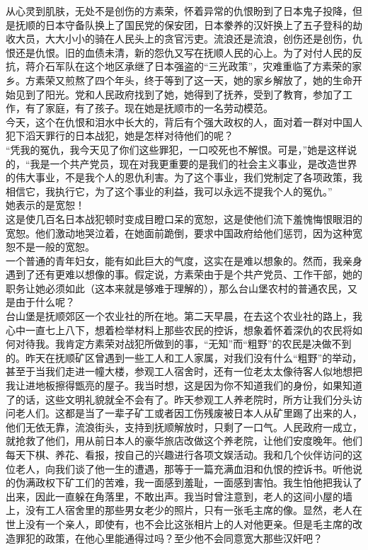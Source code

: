 从心灵到肌肤，无处不是创伤的方素荣，怀着异常的仇恨盼到了日本鬼子投降，但是抚顺的日本守备队换上了国民党的保安团，日本豢养的汉奸换上了五子登科的劫收大员，大大小小的骑在人民头上的贪官污吏。流浪还是流浪，创伤还是创伤，仇恨还是仇恨。旧的血债未清，新的怨仇又写在抚顺人民的心上。为了对付人民的反抗，蒋介石军队在这个地区承继了日本强盗的“三光政策”，灾难重临了方素荣的家乡。方素荣又煎熬了四个年头，终于等到了这一天，她的家乡解放了，她的生命开始见到了阳光。党和人民政府找到了她，她得到了抚养，受到了教育，参加了工作，有了家庭，有了孩子。现在她是抚顺市的一名劳动模范。\\

今天，这个在仇恨和泪水中长大的，背后有个强大政权的人，面对着一群对中国人犯下滔天罪行的日本战犯，她是怎样对待他们的呢？\\

“凭我的冤仇，我今天见了你们这些罪犯，一口咬死也不解恨。可是，”她是这样说的，“我是一个共产党员，现在对我更重要的是我们的社会主义事业，是改造世界的伟大事业，不是我个人的恩仇利害。为了这个事业，我们党制定了各项政策，我相信它，我执行它，为了这个事业的利益，我可以永远不提我个人的冤仇。”\\

她表示的是宽恕！\\

这是使几百名日本战犯顿时变成目瞪口呆的宽恕，这是使他们流下羞愧悔恨眼泪的宽恕。他们激动地哭泣着，在她面前跪倒，要求中国政府给他们惩罚，因为这种宽恕不是一般的宽恕。\\

一个普通的青年妇女，能有如此巨大的气度，这实在是难以想象的。然而，我亲身遇到了还有更难以想像的事。假定说，方素荣由于是个共产党员、工作干部，她的职务让她必须如此（这本来就是够难于理解的），那么台山堡农村的普通农民，又是由于什么呢？\\

台山堡是抚顺郊区一个农业社的所在地。第二天早晨，在去这个农业社的路上，我心中一直七上八下，想着检举材料上那些农民的控诉，想象着怀着深仇的农民将如何对待我。我肯定方素荣对战犯所做到的事，“无知”而“粗野”的农民是决做不到的。昨天在抚顺矿区曾遇到一些工人和工人家属，对我们没有什么“粗野”的举动，甚至于当我们走进一幢大楼，参观工人宿舍时，还有一位老太太像待客人似地想把我让进地板擦得甑亮的屋子。我当时想，这是因为你不知道我们的身份，如果知道了的话，这些文明礼貌就全不会有了。昨天参观工人养老院时，所方让我们分头访问老人们。这都是当了一辈子矿工或者因工伤残废被日本人从矿里踢了出来的人，他们无依无靠，流浪街头，支持到抚顺解放时，只剩了一口气。人民政府一成立，就抢救了他们，用从前日本人的豪华旅店改做这个养老院，让他们安度晚年。他们每天下棋、养花、看报，按自己的兴趣进行各项文娱活动。我和几个伙伴访问的这位老人，向我们谈了他一生的遭遇，那等于一篇充满血泪和仇恨的控诉书。听他说的伪满政权下矿工们的苦难，我一面感到羞耻，一面感到害怕。我生怕他把我认了出来，因此一直躲在角落里，不敢出声。我当时曾注意到，老人的这间小屋的墙上，没有工人宿舍里的那些男女老少的照片，只有一张毛主席的像。显然，老人在世上没有一个亲人，即使有，也不会比这张相片上的人对他更亲。但是毛主席的改造罪犯的政策，在他心里能通得过吗？至少他不会同意宽大那些汉奸吧？\\

